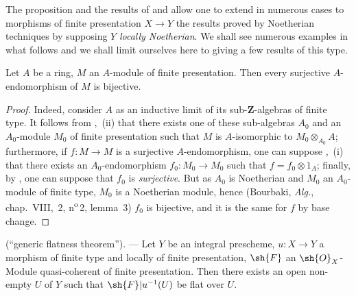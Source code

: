 \begin{env}[8.9.2]
\label{IV.8.9.2}
The proposition  and the results of  and  allow one to extend in numerous cases to morphisms of finite presentation $X\to Y$ the results proved by Noetherian techniques by supposing $Y$ \emph{locally Noetherian}.
We shall see numerous examples in what follows and we shall limit ourselves here to giving a few results of this type.
\end{env}

\begin{proposition}[8.9.3]
\label{IV.8.9.3}
Let $A$ be a ring, $M$ an $A$-module of finite presentation.
Then every surjective $A$-endomorphism of $M$ is bijective.
\end{proposition}

\begin{proof}
Indeed, consider $A$ as an inductive limit of its sub-$\mathbf{Z}$-algebras of finite type.
It follows from ,~(ii) that there exists one of these sub-algebras $A_0$ and an $A_0$-module $M_0$ of finite presentation such that $M$ is $A$-isomorphic to $M_0\otimes_{A_0}A$; furthermore, if $f:M\to M$ is a surjective $A$-endomorphism, one can suppose ,~(i) that there exists an $A_0$-endomorphism $f_0:M_0\to M_0$ such that $f=f_0\otimes 1_A$; finally, by , one can suppose that $f_0$ is \emph{surjective}.
But as $A_0$ is Noetherian and $M_0$ an $A_0$-module of finite type, $M_0$ is a Noetherian module, hence (Bourbaki, \emph{Alg.}, chap.~VIII, \textsection\,2, n\textsuperscript{o}\,2, lemma~3) $f_0$ is bijective, and it is the same for $f$ by base change.
\end{proof}

\begin{proposition}[8.9.4]
\label{IV.8.9.4}
(``generic flatness theorem''). --- Let $Y$ be an integral prescheme, $u:X\to Y$ a morphism of finite type and locally of finite presentation, $\sh{F}$ an $\sh{O}_X$-Module quasi-coherent of finite presentation.
Then there exists an open non-empty $U$ of $Y$ such that $\sh{F}|u^{-1}(U)$ be flat over $U$.
\end{proposition}

